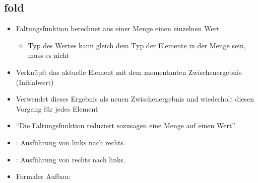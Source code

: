\documentclass{../tuda-beamer}
\begin{document}
    \subsection{fold}
    \begin{frame}{}
        \begin{itemize}
            \item Faltungsfunktion berechnet aus einer Menge einen einzelnen Wert
            \begin{itemize}
                \item Typ des Wertes kann gleich dem Typ der Elemente in der Menge sein, muss es
                nicht
            \end{itemize}
            \item Verknüpft das aktuelle Element mit dem momentanten Zwischenergebnis (Initialwert)
            \item Verwendet dieses Ergebnis als neuen Zwischenergebnis und wiederholt diesen Vorgang
            für jedes Element
            \item \enquote{Die Faltungsfunktion reduziert sozusagen eine Menge auf einen Wert}
            \item {}: Ausführung von links nach rechts.
            \item {}: Ausführung von rechts nach links.
            \item Formaler Aufbau:
            \begin{center}

            \end{center}
        \end{itemize}
    \end{frame}
\end{document}
